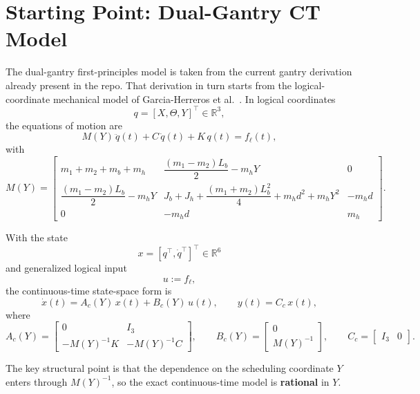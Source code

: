 ﻿\documentclass[11pt]{article}
\newcommand{\R}{\mathbb{R}}
\begin{document}
\section{Starting Point: Dual-Gantry CT Model}

The dual-gantry first-principles model is taken from the current gantry
derivation already present in the repo. That derivation in turn starts from the
logical-coordinate mechanical model of Garcia-Herreros et al.~\cite{garcia2013model}. In logical
coordinates
\[
q = [X,\Theta,Y]^\top \in \R^3,
\]
the equations of motion are
\begin{equation}
    M(Y)\,\ddot{q}(t) + C\,\dot{q}(t) + K\,q(t) = f_\ell(t),
    \label{eqv:eom}
\end{equation}
with
\begin{equation}
    M(Y) =
    \begin{bmatrix}
        m_1 + m_2 + m_b + m_h &
        \dfrac{(m_1-m_2)L_b}{2} - m_h Y &
        0 \\
        \dfrac{(m_1-m_2)L_b}{2} - m_h Y &
        J_b + J_h + \dfrac{(m_1+m_2)L_b^2}{4} + m_h d^2 + m_h Y^2 &
        -m_h d \\
        0 & -m_h d & m_h
    \end{bmatrix}.
    \label{eqv:M}
\end{equation}

With the state
\[
x = [q^\top,\dot{q}^\top]^\top \in \R^6
\]
and generalized logical input
\[
u := f_\ell,
\]
the continuous-time state-space form is
\begin{equation}
    \dot{x}(t) = A_c(Y)\,x(t) + B_c(Y)\,u(t),
    \qquad
    y(t) = C_c\,x(t),
    \label{eqv:ctss}
\end{equation}
where
\begin{equation}
    A_c(Y) =
    \begin{bmatrix}
        0 & I_3 \\
        -M(Y)^{-1}K & -M(Y)^{-1}C
    \end{bmatrix},
    \qquad
    B_c(Y) =
    \begin{bmatrix}
        0 \\
        M(Y)^{-1}
    \end{bmatrix},
    \qquad
    C_c = \begin{bmatrix} I_3 & 0 \end{bmatrix}.
    \label{eqv:ctmats}
\end{equation}

The key structural point is that the dependence on the scheduling coordinate
$Y$ enters through $M(Y)^{-1}$, so the exact continuous-time model is
\textbf{rational} in $Y$.
\end{document}

